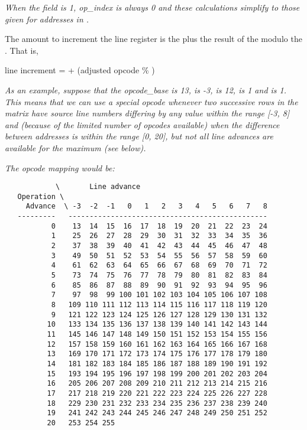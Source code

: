 \textit{When the  field is 1,
op\_index is always 0 and these calculations simplify to those
given for addresses in 
.}

The amount to increment the line register is the 
 plus
the result of the 
 modulo the 
. That
is,

\begin{myindentpara}{1cm}
line increment =  + (adjusted opcode \% )
\end{myindentpara}

\textit{As an example, suppose that the opcode\_base is 13, 
is -3,  is 12, 
 is 1
and 
 is 1. 
This means that
we can use a special opcode whenever two successive rows in
the matrix have source line numbers differing by any value
within the range [-3, 8] and (because of the limited number
of opcodes available) when the difference between addresses
is within the range [0, 20], but not all line advances are
available for the maximum  (see below).}

\textit{The opcode mapping would be:}
\begin{verbatim}
            \       Line advance
   Operation \
     Advance  \ -3  -2  -1   0   1   2   3   4   5   6   7   8
   ---------   -----------------------------------------------
           0    13  14  15  16  17  18  19  20  21  22  23  24
           1    25  26  27  28  29  30  31  32  33  34  35  36
           2    37  38  39  40  41  42  43  44  45  46  47  48
           3    49  50  51  52  53  54  55  56  57  58  59  60
           4    61  62  63  64  65  66  67  68  69  70  71  72
           5    73  74  75  76  77  78  79  80  81  82  83  84
           6    85  86  87  88  89  90  91  92  93  94  95  96
           7    97  98  99 100 101 102 103 104 105 106 107 108
           8   109 110 111 112 113 114 115 116 117 118 119 120
           9   121 122 123 124 125 126 127 128 129 130 131 132
          10   133 134 135 136 137 138 139 140 141 142 143 144
          11   145 146 147 148 149 150 151 152 153 154 155 156
          12   157 158 159 160 161 162 163 164 165 166 167 168
          13   169 170 171 172 173 174 175 176 177 178 179 180
          14   181 182 183 184 185 186 187 188 189 190 191 192
          15   193 194 195 196 197 198 199 200 201 202 203 204
          16   205 206 207 208 209 210 211 212 213 214 215 216
          17   217 218 219 220 221 222 223 224 225 226 227 228 
          18   229 230 231 232 233 234 235 236 237 238 239 240 
          19   241 242 243 244 245 246 247 248 249 250 251 252
          20   253 254 255
\end{verbatim}


